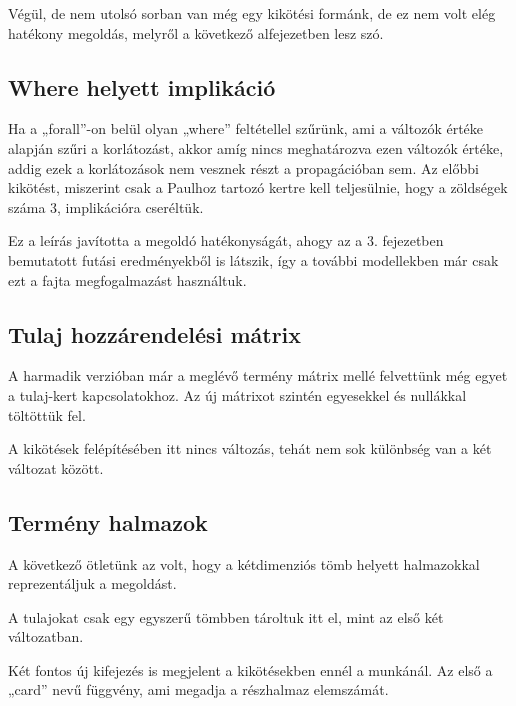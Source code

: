 \documentclass[12pt,a4paper,twoside, openright]{report}
\begin{document}

    Végül, de nem utolsó sorban van még egy kikötési formánk, de ez nem volt elég hatékony megoldás, melyről a következő alfejezetben lesz szó.


\subsection{Where helyett implikáció}

    Ha a „forall”-on belül olyan „where” feltétellel szűrünk, ami a változók értéke alapján szűri a korlátozást, akkor amíg nincs meghatározva ezen változók értéke, addig ezek a korlátozások nem vesznek részt a propagációban sem.
    Az előbbi kikötést, miszerint csak a Paulhoz tartozó kertre kell teljesülnie, hogy a zöldségek száma 3, implikációra cseréltük.


    Ez a leírás javította a megoldó hatékonyságát, ahogy az a 3. fejezetben bemutatott futási eredményekből is látszik, így a további modellekben már csak ezt a fajta megfogalmazást 
    használtuk.


\subsection{Tulaj hozzárendelési mátrix}

    A harmadik verzióban már a meglévő termény mátrix mellé felvettünk még egyet a tulaj-kert kapcsolatokhoz.
    Az új mátrixot szintén egyesekkel és nullákkal töltöttük fel.


    A kikötések felépítésében itt nincs változás, tehát nem sok különbség van a két változat között.

\subsection{Termény halmazok}

    A következő ötletünk az volt, hogy a kétdimenziós tömb helyett halmazokkal reprezentáljuk a megoldást.


    A tulajokat csak egy egyszerű tömbben tároltuk itt el, mint az első két változatban.

    Két fontos új kifejezés is megjelent a kikötésekben ennél a munkánál.
    Az első a „card” nevű függvény, ami megadja a részhalmaz elemszámát.
\end{document}
